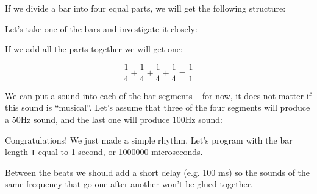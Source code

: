 \documentclass[../sparc.tex]{subfiles}
\begin{document}
If we divide a bar into four equal parts, we will get the following structure:


Let's take one of the bars and investigate it closely:


If we add all the parts together we will get one:

\begin{equation}
  \frac{1}{4} + \frac{1}{4} + \frac{1}{4} + \frac{1}{4} = \frac{1}{1}
\end{equation}

We can put a sound into each of the bar segments -- for now, it does not matter
if this sound is ``musical''.  Let's assume that three of the four segments will
produce a 50\gls{Hz} sound, and the last one will produce 100Hz sound:


Congratulations!  We just made a simple rhythm.  Let's program with the bar
length \texttt{T} equal to 1 second, or 1000000 microseconds.

Between the beats we should add a short delay (e.g. 100 ms) so the sounds of the
same frequency that go one after another won't be glued together.
\end{document}
